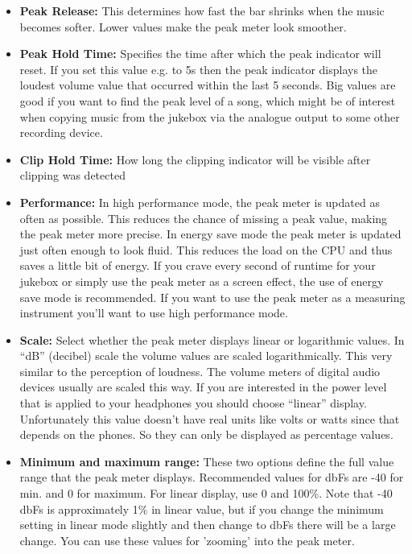 \begin{itemize}
\begin{itemize}
\item \textbf{Peak Release:}
This determines how fast the bar shrinks when the music becomes softer.
Lower values make the peak meter look smoother.
\item \textbf{Peak Hold Time:} 
Specifies the time after which the peak indicator will reset. If you set this value e.g. to 5s then the peak indicator displays the loudest volume value
that occurred within the last 5 seconds. Big values are good if you
want to find the peak level of a song, which might be of interest when
copying music from the jukebox via the analogue output to some other
recording device.
\item \textbf{Clip Hold Time:}
How long the clipping indicator will be visible after clipping was detected
\item \textbf{Performance:}
In high performance mode, the peak meter is updated as often as possible. This reduces the chance of missing a peak value, making the peak meter more precise. In energy save mode the peak meter is updated just often enough to look fluid.
This reduces the load on the CPU and thus saves a little bit of energy. If you crave every second of runtime for your jukebox or simply use the peak meter as a screen effect, the use of energy save mode is recommended. If you want to use
the peak meter as a measuring instrument you'll want to use high performance mode.
\item \textbf{Scale:}
Select whether the peak meter displays linear or logarithmic values. In
``dB'' (decibel) scale the volume values are scaled logarithmically.
This very similar to the perception of loudness. The volume meters of
digital audio devices usually are scaled this way. If you are
interested in the power level that is applied to your headphones you
should choose ``linear'' display. Unfortunately this value
doesn't have real units like volts or watts since that
depends on the phones. So they can only be displayed as percentage
values.
\item \textbf{Minimum and maximum range:} These two options define the
full value range that the peak meter displays. Recommended values for
dbFs are {}-40 for min. and 0 for maximum. For linear display, use 0
and 100\%. Note that {}-40 dbFs is approximately 1\% in linear value,
but if you change the minimum setting in linear mode slightly and then change to dbFs there will be a large change. You can use these values for
'zooming' into the peak meter.
\end{itemize}
\end{itemize}

